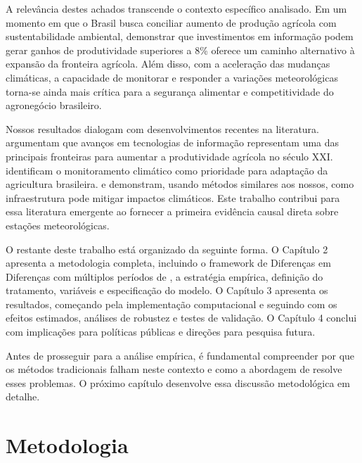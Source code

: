 \documentclass[
	12pt,				%
	oneside,			%
	a4paper,			%
	english,			%
	french,				%
	spanish,			%
	brazil				%
	]{abntex2}
\begin{document}
A relevância destes achados transcende o contexto específico analisado. Em um momento em que o Brasil busca conciliar aumento de produção agrícola com sustentabilidade ambiental, demonstrar que investimentos em informação podem gerar ganhos de produtividade superiores a 8\% oferece um caminho alternativo à expansão da fronteira agrícola. Além disso, com a aceleração das mudanças climáticas, a capacidade de monitorar e responder a variações meteorológicas torna-se ainda mais crítica para a segurança alimentar e competitividade do agronegócio brasileiro.

Nossos resultados dialogam com desenvolvimentos recentes na literatura.  argumentam que avanços em tecnologias de informação representam uma das principais fronteiras para aumentar a produtividade agrícola no século XXI.  identificam o monitoramento climático como prioridade para adaptação da agricultura brasileira.  e  demonstram, usando métodos similares aos nossos, como infraestrutura pode mitigar impactos climáticos. Este trabalho contribui para essa literatura emergente ao fornecer a primeira evidência causal direta sobre estações meteorológicas.

O restante deste trabalho está organizado da seguinte forma. O Capítulo 2 apresenta a metodologia completa, incluindo o framework de Diferenças em Diferenças com múltiplos períodos de , a estratégia empírica, definição do tratamento, variáveis e especificação do modelo. O Capítulo 3 apresenta os resultados, começando pela implementação computacional e seguindo com os efeitos estimados, análises de robustez e testes de validação. O Capítulo 4 conclui com implicações para políticas públicas e direções para pesquisa futura.

Antes de prosseguir para a análise empírica, é fundamental compreender por que os métodos tradicionais falham neste contexto e como a abordagem de  resolve esses problemas. O próximo capítulo desenvolve essa discussão metodológica em detalhe.

\chapter{Metodologia}
\end{document}
